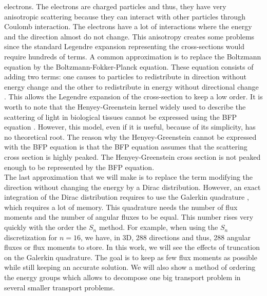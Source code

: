 electrons. The electrons are charged particles and thus, they have very
anisotropic scattering because they can interact with other particles through 
Coulomb interaction. The electrons have a lot of interactions where the energy 
and the direction almost do not change. This anisotropy creates some problems 
since the standard Legendre expansion representing the cross-sections would 
require hundreds of terms. A common approximation is to replace the Boltzmann 
equation by the Boltzmann-Fokker-Planck equation. These equation consists of 
adding two terms: one causes to particles to redistribute in direction without 
energy change and the other to redistribute in energy without directional 
change \cite{morel_81}. This allows the Legendre expansion of the cross-section to 
keep a low order. It is worth to note that the Henyey-Greenstein kernel widely used 
to describe the scattering of light in biological tissues cannot be expressed using 
the BFP equation \cite{larsen}. However, this model, even if it is useful, because 
of its simplicity, has no theoretical root. The reason why the Henyey-Greenstein 
cannot be expressed with the BFP equation is that the BFP equation assumes that the 
scattering cross section is highly peaked. The Henyey-Greenstein cross section is 
not peaked enough to be represented by the BFP equation.\\ 
The last approximation that we will make is to replace the term modifying the
direction without changing the energy by a Dirac distribution. However, an exact 
integration of the Dirac distribution requires to use the Galerkin quadrature 
\cite{graal}, which requires a lot of memory. This quadrature needs the number of 
flux moments and the number of angular fluxes to be equal. This number rises very 
quickly with the order the $S_n$ method. For example, when using the $S_n$ 
discretization for $n=16$, we have, in 3D, 288 directions and thus, 288 angular 
fluxes or flux moments to store. In this work, we will see the effects of truncation 
on the Galerkin quadrature. The goal is to keep as few flux moments as possible while 
still keeping an accurate solution. We will also show a method of ordering
the energy groups which allows to decompose one big transport problem in
several smaller transport problems.
